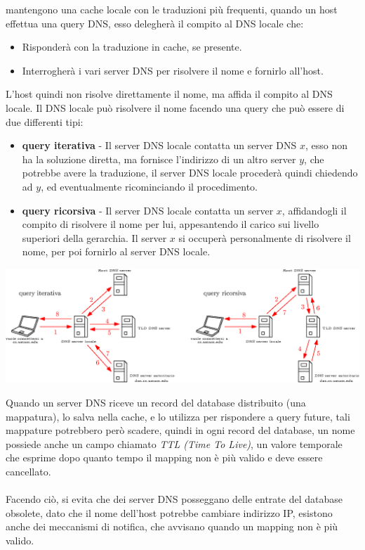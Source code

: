 \documentclass[12pt, letterpaper]{article}
\newcommand{\acc}{\\\hphantom{}\\}
\begin{document}
mantengono una cache locale con le traduzioni più frequenti, quando un host effettua una query DNS, esso
delegherà il compito al DNS locale che:\begin{itemize}
    \item Risponderà con la traduzione in cache, se presente.
    \item Interrogherà i vari server DNS per risolvere il nome e fornirlo all'host.
\end{itemize}
L'host quindi non risolve direttamente il nome, ma affida il compito al DNS locale. Il DNS locale può
risolvere il nome facendo una query che può essere di due differenti tipi:\begin{itemize}
    \item \textbf{query iterativa} - Il server DNS locale contatta un server DNS $x$, esso non ha
          la soluzione diretta, ma fornisce l'indirizzo di un altro server $y$, che potrebbe avere la
          traduzione, il server DNS locale procederà quindi chiedendo ad $y$, ed eventualmente ricominciando il
          procedimento.
    \item \textbf{query ricorsiva} - Il server DNS locale contatta un server $x$, affidandogli il
          compito di risolvere il nome per lui, appesantendo il carico sui livello superiori della gerarchia. Il
          server $x$ si occuperà personalmente di risolvere il nome, per poi fornirlo al server DNS locale.
\end{itemize}\begin{center}
    \includegraphics[width=1\textwidth ]{images/risoluzioneDNS.eps}
\end{center}
Quando un server DNS riceve un record del database distribuito (una mappatura), lo salva nella cache,
e lo utilizza per rispondere a query future, tali mappature potrebbero però scadere, quindi in ogni record del
database, un nome possiede anche un campo chiamato \textit{TTL (Time To Live)}, un valore temporale che
esprime dopo quanto tempo il mapping non è più valido e deve essere cancellato.\acc Facendo ciò, si evita che
dei server DNS posseggano delle entrate del database obsolete, dato che il nome dell'host potrebbe
cambiare indirizzo IP, esistono anche dei meccanismi di notifica, che avvisano quando un mapping non è
più valido.
\end{document}
